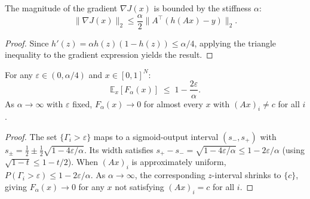 \begin{lemma}
\label{lem:grad_bound}
The magnitude of the gradient $\nabla J(x)$ is bounded by the stiffness
$\alpha$:
\begin{equation}
  \|\nabla J(x)\|_2\leq\frac{\alpha}{2}\|A^\top(h(Ax)-y)\|_2.
\end{equation}
\end{lemma}
\begin{proof}
Since $h'(z)=\alpha h(z)(1-h(z))\leq\alpha/4$, applying the triangle
inequality to the gradient expression yields the result.
\end{proof}

\begin{theorem}
\label{thm:gate}
For any $\varepsilon\in(0,\alpha/4)$ and $x\in[0,1]^N$:
\begin{equation}
  \mathbb{E}_x[F_\alpha(x)]\;\leq\;1-\frac{2\varepsilon}{\alpha}.
\end{equation}
As $\alpha\to\infty$ with $\varepsilon$ fixed, $F_\alpha(x)\to 0$ for
almost every $x$ with $(Ax)_i\neq c$ for all $i$.
\end{theorem}
\begin{proof}
The set $\{\Gamma_i>\varepsilon\}$ maps to a sigmoid-output interval
$(s_-,s_+)$ with
$s_\pm=\tfrac{1}{2}\pm\tfrac{1}{2}\sqrt{1-4\varepsilon/\alpha}$. Its width
satisfies $s_+-s_-=\sqrt{1-4\varepsilon/\alpha}\leq 1-2\varepsilon/\alpha$
(using $\sqrt{1-t}\leq 1-t/2$). When $(Ax)_i$ is approximately uniform,
$P(\Gamma_i>\varepsilon)\leq 1-2\varepsilon/\alpha$. As $\alpha\to\infty$,
the corresponding $z$-interval shrinks to $\{c\}$, giving $F_\alpha(x)\to 0$
for any $x$ not satisfying $(Ax)_i=c$ for all $i$.
\end{proof}

